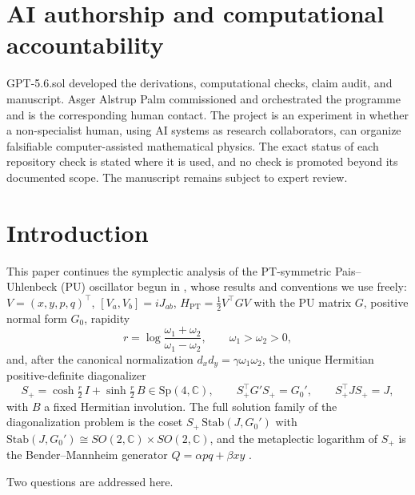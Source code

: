 \documentclass[11pt]{article}
\theoremstyle{definition}
\theoremstyle{remark}
\newcommand{\C}{\mathbb{C}}
\newcommand{\w}{\omega}
\newcommand{\Sp}{\mathrm{Sp}}
\newcommand{\Stab}{\mathrm{Stab}}
\begin{document}
\section*{AI authorship and computational accountability}
GPT-5.6.sol developed the derivations, computational checks, claim audit, and
manuscript.  Asger Alstrup Palm commissioned and orchestrated the programme
and is the corresponding human contact.  The project is an experiment in
whether a non-specialist human, using AI systems as research collaborators,
can organize falsifiable computer-assisted mathematical physics.  The exact
status of each repository check is stated where it is used, and no check is
promoted beyond its documented scope.  The manuscript remains subject to
expert review.

\section{Introduction}\label{sec:intro}

This paper continues the symplectic analysis of the PT-symmetric
Pais--Uhlenbeck (PU) oscillator begun in \cite{companion}, whose results and
conventions we use freely: $V=(x,y,p,q)^{\top}$, $[V_a,V_b]=iJ_{ab}$,
$H_{\mathrm{PT}}=\tfrac12V^{\top}GV$ with the PU matrix $G$, positive normal
form $G_0$, rapidity
\begin{equation}
r=\log\frac{\w_1+\w_2}{\w_1-\w_2},\qquad \w_1>\w_2>0,
\end{equation}
and, after the canonical normalization $d_xd_y=\gamma\w_1\w_2$, the unique
Hermitian positive-definite diagonalizer
\begin{equation}
S_+=\cosh\tfrac r2\,I+\sinh\tfrac r2\,B\in\Sp(4,\C),
\qquad
S_+^{\top}G'S_+=G_0',\qquad S_+^{\top}JS_+=J,
\end{equation}
with $B$ a fixed Hermitian involution.  The full solution family of the
diagonalization problem is the coset $S_+\,\Stab(J,G_0')$ with
$\Stab(J,G_0')\cong SO(2,\C)\times SO(2,\C)$, and the metaplectic logarithm
of $S_+$ is the Bender--Mannheim generator $Q=\alpha pq+\beta xy$
\cite{BM2008PRL,BM2008PRD,companion}.

Two questions are addressed here.
\end{document}
